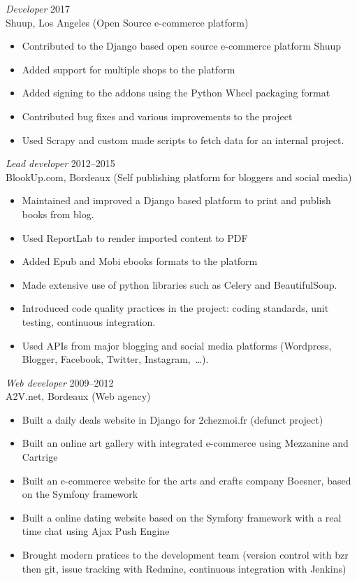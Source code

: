 \documentclass[line,resmargin]{res}
\begin{document}
\begin{resume}
{\sl Developer\/} \hfill 2017\\
Shuup, Los Angeles (Open Source e-commerce platform)
\begin{itemize} \itemsep -2pt
    \item Contributed to the Django based open source e-commerce platform Shuup
    \item Added support for multiple shops to the platform
    \item Added signing to the addons using the Python Wheel packaging format
    \item Contributed bug fixes and various improvements to the project
    \item Used Scrapy and custom made scripts to fetch data for an internal project.
\end{itemize}

{\sl Lead developer\/} \hfill 2012--2015\\
BlookUp.com, Bordeaux (Self publishing platform for bloggers and social media)
\begin{itemize} \itemsep -2pt
    \item Maintained and improved a Django based platform to print and publish books from blog.
    \item Used ReportLab to render imported content to PDF
    \item Added Epub and Mobi ebooks formats to the platform
    \item Made extensive use of python libraries such as Celery and BeautifulSoup.
    \item Introduced code quality practices in the project: coding standards, unit testing, continuous integration.
    \item Used APIs from major blogging and social media platforms (Wordpress, Blogger, Facebook, Twitter, Instagram, …).
\end{itemize}

{\sl Web developer\/} \hfill 2009--2012 \\
A2V.net, Bordeaux (Web agency)
\begin{itemize}  \itemsep -2pt
    \item Built a daily deals website in Django for 2chezmoi.fr (defunct project)
    \item Built an online art gallery with integrated e-commerce using Mezzanine and Cartrige
    \item Built an e-commerce website for the arts and crafts company Boesner, based on the Symfony framework
    \item Built a online dating website based on the Symfony framework with a real time chat using Ajax Push Engine
    \item Brought modern pratices to the development team (version control with bzr then git,
        issue tracking with Redmine, continuous integration with Jenkins)
\end{itemize}


\end{resume}
\end{document}
